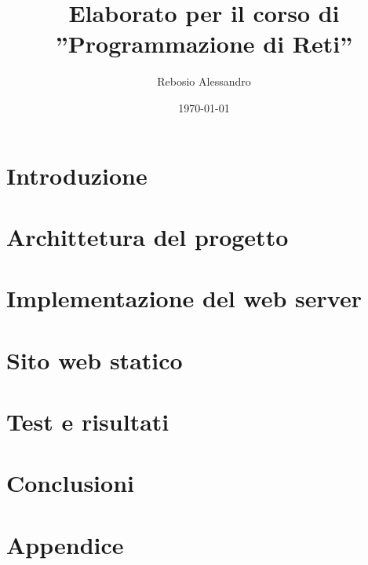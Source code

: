 \documentclass[a4paper,12pt]{report}
\title{Elaborato per il corso di\\''Programmazione di Reti''}
\author{
    Rebosio Alessandro
}
\date{\today}
\begin{document}
\maketitle

\tableofcontents

\chapter{Introduzione}

\chapter{Archittetura del progetto}

\chapter{Implementazione del web server}

\chapter{Sito web statico}

\chapter{Test e risultati}

\chapter{Conclusioni}

\chapter{Appendice}

% 
% 
\end{document}

